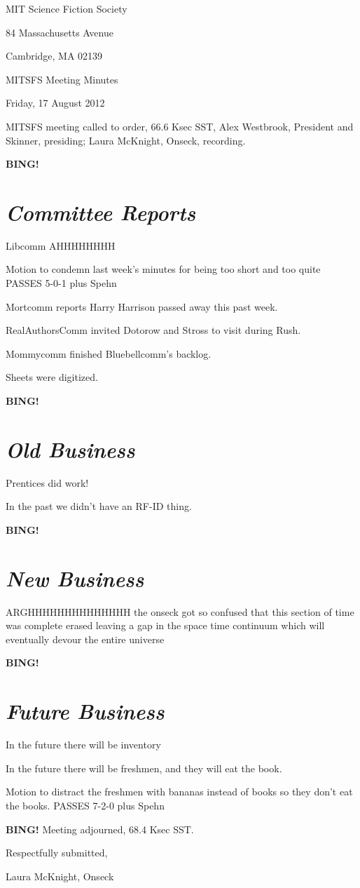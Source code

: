 \documentclass[10pt]{article}
\newcommand{\bing}{{\bf BING!} }
\newcommand{\goto}[1]{\bing \vskip 12pt \section*{{\em{#1}}}}
\newcommand{\ps}{ plus Spehn\xspace}
\newcommand{\skinner}{Alex Westbrook, President and Skinner}
\newcommand{\onseck}{Laura McKnight, Onseck}
\newcommand{\meetingdate}{Friday, 17 August 2012}
\begin{document}
\begin{center}

MIT Science Fiction Society

84 Massachusetts Avenue

Cambridge, MA 02139

\vspace{12pt}

MITSFS Meeting Minutes

\meetingdate

\end{center}

\vspace{18pt}

\setlength{\parskip}{6pt}

\noindent
MITSFS meeting called to order, 66.6 Ksec SST,
\skinner, presiding; \onseck, recording.


\goto{Committee Reports}



Libcomm AHHHHHHHH

Motion to condemn last week's minutes for being too short and too quite PASSES 5-0-1 \ps

Mortcomm reports Harry Harrison passed away this past week.

RealAuthorsComm invited Dotorow and Stross to visit during Rush.

Mommycomm finished Bluebellcomm's backlog.

Sheets were digitized.

\goto{Old Business}

Prentices did work! 

In the past we didn't have an RF-ID thing.

\goto{New Business}

ARGHHHHHHHHHHHHHH the onseck got so confused that this section of time was complete erased leaving a gap in the space time continuum which will eventually devour the entire universe

\goto{Future Business}

In the future there will be inventory

In the future there will be freshmen, and they will eat the book.

Motion to distract the freshmen with bananas instead of books so they don't eat the books. PASSES 7-2-0 \ps

\bing
\noindent
Meeting adjourned, 68.4 Ksec SST.

\vspace{18pt}

\centerline{Respectfully submitted,}
\centerline{\onseck}
\end{document}
